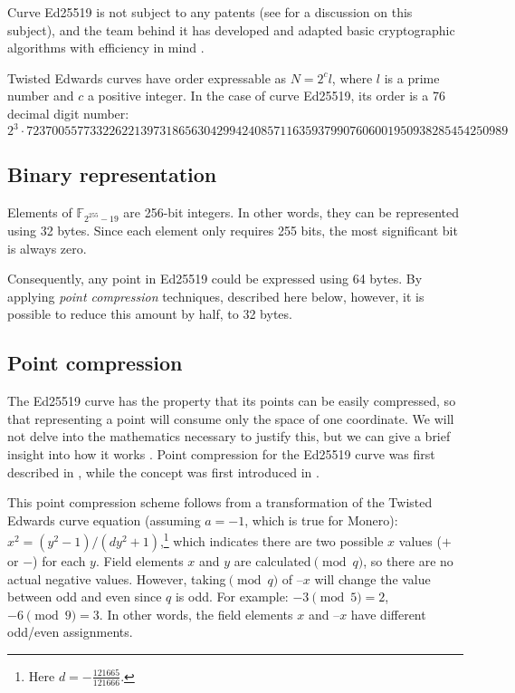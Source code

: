 Curve Ed25519 is not subject to any patents (see \cite{ECC-patents} for a discussion on this subject), and the team behind it has
developed and adapted basic cryptographic algorithms with efficiency in mind \cite{Bernstein2007}.

Twisted Edwards curves have order expressable as \(N=2^c l\), where \(l\) is a prime number and \(c\) a positive integer. In the case of curve Ed25519, its order is a 76 decimal digit number:
\[2^3 \cdot 7237005577332262213973186563042994240857116359379907606001950938285454250989\]


\subsection{Binary representation}
\label{binary_note}
Elements of \(\mathbb{F}_{2^{255} - 19} \) are 256-bit integers. In other words, they can be represented using 32 bytes. Since each element only requires 255 bits, the most significant bit is always zero.

Consequently, any point in Ed25519 could be expressed using 64 bytes. By applying {\em point compression} techniques, described here below, however, it is possible to reduce this amount by half, to 32 bytes.


\subsection{Point compression}
\label{point_compression_section}

The Ed25519 curve has the property that its points can be easily compressed, so that representing a point will consume only the space of one coordinate. We will not delve into the mathematics necessary to justify this, but we can give a brief insight into how it works \cite{eddsa-ed25519-irtf}. Point compression for the Ed25519 curve was first described in \cite{Bernstein2012}, while the concept was first introduced in \cite{Miller:point-compression-origin}.

This point compression scheme follows from a transformation of the Twisted Edwards curve equation (assuming $a = -1$, which is true for Monero): $x^2 = (y^2-1)/(d y^2+1)$,\footnote{Here $d = - \frac{121665}{121666}$.} which indicates there are two possible $x$ values ($+$ or $-$) for each $y$. Field elements $x$ and $y$ are calculated$\pmod{q}$, so there are no actual negative values. However, taking$\pmod{q}$ of $–x$ will change the value between odd and even since $q$ is odd. For example: $-3 \pmod{5} = 2$, $-6 \pmod{9} = 3$. In other words, the field elements $x$ and $–x$ have different odd/even assignments.

